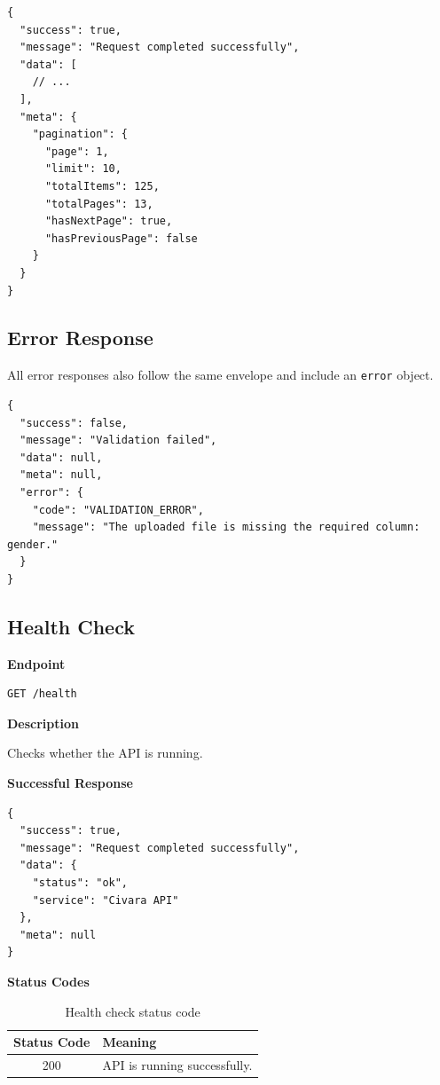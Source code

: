 \documentclass[12pt,a4paper]{article}
\begin{document}
\begin{lstlisting}
{
  "success": true,
  "message": "Request completed successfully",
  "data": [
    // ...
  ],
  "meta": {
    "pagination": {
      "page": 1,
      "limit": 10,
      "totalItems": 125,
      "totalPages": 13,
      "hasNextPage": true,
      "hasPreviousPage": false
    }
  }
}
\end{lstlisting}

\subsection{Error Response}

All error responses also follow the same envelope and include an \texttt{error} object.

\begin{lstlisting}
{
  "success": false,
  "message": "Validation failed",
  "data": null,
  "meta": null,
  "error": {
    "code": "VALIDATION_ERROR",
    "message": "The uploaded file is missing the required column: gender."
  }
}
\end{lstlisting}

\subsection{Health Check}

\textbf{Endpoint}

\begin{lstlisting}
GET /health
\end{lstlisting}

\textbf{Description}

Checks whether the API is running.

\textbf{Successful Response}

\begin{lstlisting}
{
  "success": true,
  "message": "Request completed successfully",
  "data": {
    "status": "ok",
    "service": "Civara API"
  },
  "meta": null
}
\end{lstlisting}

\textbf{Status Codes}

\begin{table}[h!]
\centering
\renewcommand{\arraystretch}{1.3}
\begin{tabular}{c p{9cm}}
\toprule
\textbf{Status Code} & \textbf{Meaning} \\
\midrule
200 & API is running successfully. \\
\bottomrule
\end{tabular}
\caption{Health check status code}
\end{table}
\end{document}
